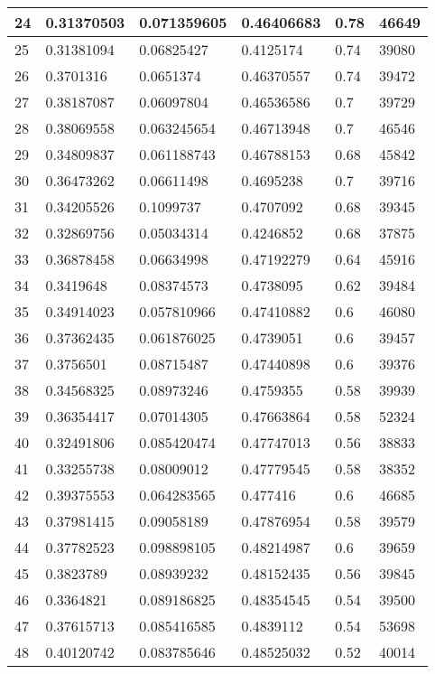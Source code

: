 \begin{longtable}{|l|l|l|l|l|l|}
24 & 0.31370503 & 0.071359605 & 0.46406683 & 0.78 & 46649 \\ \hline 
25 & 0.31381094 & 0.06825427 & 0.4125174 & 0.74 & 39080 \\ \hline 
26 & 0.3701316 & 0.0651374 & 0.46370557 & 0.74 & 39472 \\ \hline 
27 & 0.38187087 & 0.06097804 & 0.46536586 & 0.7 & 39729 \\ \hline 
28 & 0.38069558 & 0.063245654 & 0.46713948 & 0.7 & 46546 \\ \hline 
29 & 0.34809837 & 0.061188743 & 0.46788153 & 0.68 & 45842 \\ \hline 
30 & 0.36473262 & 0.06611498 & 0.4695238 & 0.7 & 39716 \\ \hline 
31 & 0.34205526 & 0.1099737 & 0.4707092 & 0.68 & 39345 \\ \hline 
32 & 0.32869756 & 0.05034314 & 0.4246852 & 0.68 & 37875 \\ \hline 
33 & 0.36878458 & 0.06634998 & 0.47192279 & 0.64 & 45916 \\ \hline 
34 & 0.3419648 & 0.08374573 & 0.4738095 & 0.62 & 39484 \\ \hline 
35 & 0.34914023 & 0.057810966 & 0.47410882 & 0.6 & 46080 \\ \hline 
36 & 0.37362435 & 0.061876025 & 0.4739051 & 0.6 & 39457 \\ \hline 
37 & 0.3756501 & 0.08715487 & 0.47440898 & 0.6 & 39376 \\ \hline 
38 & 0.34568325 & 0.08973246 & 0.4759355 & 0.58 & 39939 \\ \hline 
39 & 0.36354417 & 0.07014305 & 0.47663864 & 0.58 & 52324 \\ \hline 
40 & 0.32491806 & 0.085420474 & 0.47747013 & 0.56 & 38833 \\ \hline 
41 & 0.33255738 & 0.08009012 & 0.47779545 & 0.58 & 38352 \\ \hline 
42 & 0.39375553 & 0.064283565 & 0.477416 & 0.6 & 46685 \\ \hline 
43 & 0.37981415 & 0.09058189 & 0.47876954 & 0.58 & 39579 \\ \hline 
44 & 0.37782523 & 0.098898105 & 0.48214987 & 0.6 & 39659 \\ \hline 
45 & 0.3823789 & 0.08939232 & 0.48152435 & 0.56 & 39845 \\ \hline 
46 & 0.3364821 & 0.089186825 & 0.48354545 & 0.54 & 39500 \\ \hline 
47 & 0.37615713 & 0.085416585 & 0.4839112 & 0.54 & 53698 \\ \hline 
48 & 0.40120742 & 0.083785646 & 0.48525032 & 0.52 & 40014 \\ \hline 

\end{longtable}
